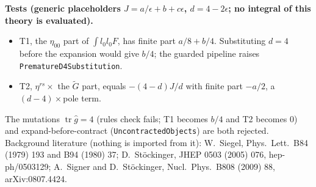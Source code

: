 \textbf{Tests (generic placeholders $J=a/\epsilon+b+c\epsilon$, $d=4-2\epsilon$; no integral of this theory is evaluated).}
\begin{itemize}
\item T1, the $\eta_{00}$ part of $\int l_0l_0F$, has finite part $a/8+b/4$. Substituting $d=4$ before the expansion
would give $b/4$; the guarded pipeline raises \texttt{PrematureD4Substitution}.
\item T2, $\eta^{rs}\times$ the $\tilde G$ part, equals $-(4-d)J/d$ with finite part $-a/2$, a $(d-4)\times$pole term.
\end{itemize}
The mutations $\operatorname{tr}\hat g=4$ (rules check fails; T1 becomes $b/4$ and T2 becomes 0) and
expand-before-contract (\texttt{UncontractedObjects}) are both rejected. Background literature (nothing is imported from
it): W.~Siegel, Phys.\ Lett.\ B84 (1979) 193 and B94 (1980) 37; D.~St\"ockinger, JHEP 0503 (2005) 076, hep-ph/0503129;
A.~Signer and D.~St\"ockinger, Nucl.\ Phys.\ B808 (2009) 88, arXiv:0807.4424.

